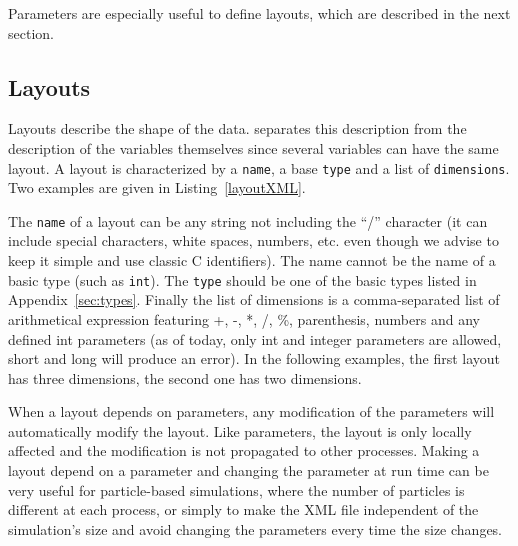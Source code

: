 \noindent\begin{minipage}{\textwidth}
\vspace{0.5cm}

\end{minipage}

\noindent\begin{minipage}{\textwidth}
\vspace{0.5cm}

\end{minipage}

Parameters are especially useful to define layouts, which are described in the next section.

\subsection{Layouts}

Layouts describe the shape of the data. \Damaris{} separates this description from the description
of the variables themselves since several variables can have the same layout.
A layout is characterized by a \texttt{name}, a base \texttt{type} and a list of \texttt{dimensions}.
Two examples are given in Listing~\ref{layoutXML}.

The \texttt{name} of a layout can be any string not including the ``/'' character 
(it can include special characters, white spaces, numbers, etc. even
though we advise to keep it simple and use classic C identifiers). 
The name cannot be the name of a basic type (such as \texttt{int}).
The \texttt{type} should be one of the basic types listed in Appendix~\ref{sec:types}.
Finally the list of dimensions is a comma-separated list of arithmetical expression featuring
+, -, *, /, \%, parenthesis, numbers and any defined int parameters (as of today, only int and integer 
parameters are allowed, short and long will produce an error).
In the following examples, the first layout has three dimensions, the second one has two dimensions.

When a layout depends on parameters, any modification of the parameters will automatically modify
the layout. Like parameters, the layout is only locally affected and the modification is not propagated to
other processes. Making a layout depend on a parameter and changing the parameter at run time 
can be very useful for particle-based simulations, where the number of particles is different at each process,
or simply to make the XML file independent of the simulation's size and avoid changing the parameters
every time the size changes.

